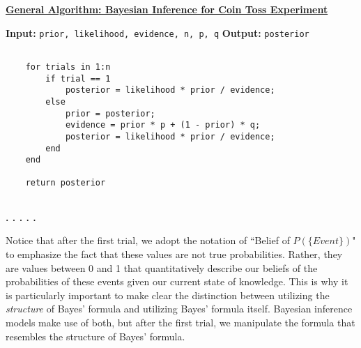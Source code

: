 \begin{framed}
\underline{\textbf{General Algorithm: Bayesian Inference for Coin Toss Experiment}}

\textbf{Input:} \texttt{prior, likelihood, evidence, n, p, q}
\newline
\textbf{Output:} \texttt{posterior}
\begin{verbatim}

    for trials in 1:n
        if trial == 1
            posterior = likelihood * prior / evidence;
        else
            prior = posterior;
            evidence = prior * p + (1 - prior) * q;
            posterior = likelihood * prior / evidence;
        end
    end
    
    return posterior
    
\end{verbatim}
\end{framed}
\textbf{. . . . .}

Notice that after the first trial, we adopt the notation of ``Belief of $P(\{Event\})$" to emphasize the fact that these values are not true probabilities. Rather, they are values between 0 and 1 that quantitatively describe our beliefs of the probabilities of these events given our current state of knowledge. This is why it is particularly important to make clear the distinction between utilizing the \textit{structure} of Bayes' formula and utilizing Bayes' formula itself. Bayesian inference models make use of both, but after the first trial, we manipulate the formula that resembles the structure of Bayes' formula.